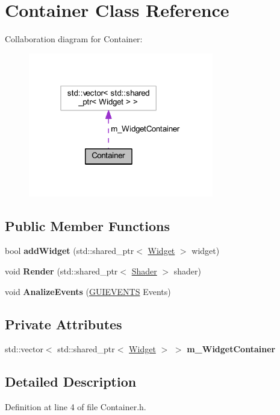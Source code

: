 \hypertarget{class_container}{}\section{Container Class Reference}
\label{class_container}


Collaboration diagram for Container\+:
\nopagebreak
\begin{figure}[H]
\begin{center}
\leavevmode
\includegraphics[width=229pt]{class_container__coll__graph}
\end{center}
\end{figure}
\subsection*{Public Member Functions}
\begin{DoxyCompactItemize}
\item 
bool {\bfseries add\+Widget} (std\+::shared\+\_\+ptr$<$ \hyperlink{class_widget}{Widget} $>$ widget)\hypertarget{class_container_afb008983dab9b54b9281954acce7a769}{}\label{class_container_afb008983dab9b54b9281954acce7a769}

\item 
void {\bfseries Render} (std\+::shared\+\_\+ptr$<$ \hyperlink{class_shader}{Shader} $>$ shader)\hypertarget{class_container_a3f42908e326e7cd5e02922bcdafe126c}{}\label{class_container_a3f42908e326e7cd5e02922bcdafe126c}

\item 
void {\bfseries Analize\+Events} (\hyperlink{struct_g_u_i_e_v_e_n_t_s}{G\+U\+I\+E\+V\+E\+N\+TS} Events)\hypertarget{class_container_aa80ad9b67044647b6891443b94098beb}{}\label{class_container_aa80ad9b67044647b6891443b94098beb}

\end{DoxyCompactItemize}
\subsection*{Private Attributes}
\begin{DoxyCompactItemize}
\item 
std\+::vector$<$ std\+::shared\+\_\+ptr$<$ \hyperlink{class_widget}{Widget} $>$ $>$ {\bfseries m\+\_\+\+Widget\+Container}\hypertarget{class_container_ae071597fef1204072f500f7384b5ae47}{}\label{class_container_ae071597fef1204072f500f7384b5ae47}

\end{DoxyCompactItemize}


\subsection{Detailed Description}


Definition at line 4 of file Container.\+h.

